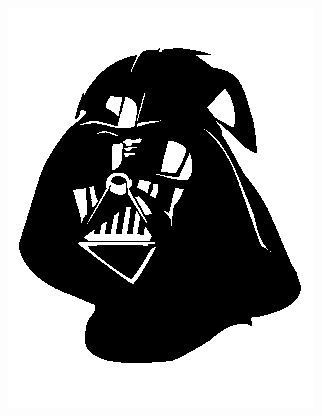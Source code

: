 \documentclass[]{article}
\begin{document}
\begin{section}
	\begin{figure}
            \centering

            \begin{subfigure}{0.4\textwidth}
                \centering
                \includegraphics[width=\textwidth]{darthvader.png}
                \caption{}
                \label{fig:3_3:darthvader}
            \end{subfigure}
            \begin{subfigure}{0.4\textwidth}
                \centering

\end{subfigure}
\end{figure}
\end{section}
\end{document}
